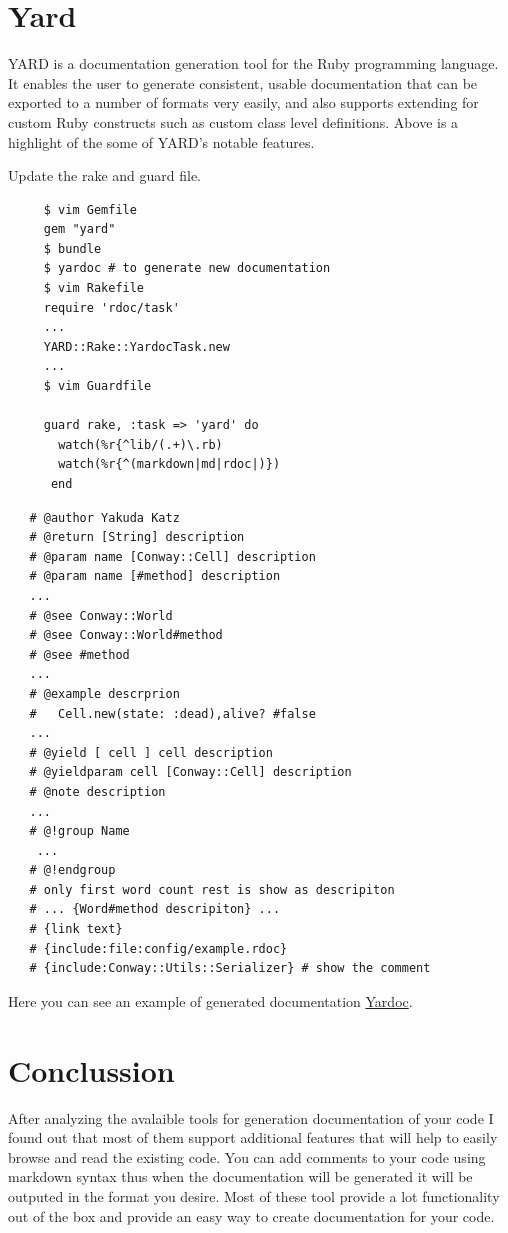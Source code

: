 \documentclass{article}
\begin{document}
  \section{Yard}

  YARD is a documentation generation tool for the Ruby programming language. It enables 
  the user to generate consistent, usable documentation that can be exported to a number 
  of formats very easily, and also supports extending for custom Ruby constructs such 
  as custom class level definitions. Above is a highlight of the some of YARD's notable features.

   Update the rake and guard file.

  \begin{lstlisting}
     $ vim Gemfile
     gem "yard"
     $ bundle
     $ yardoc # to generate new documentation
     $ vim Rakefile
     require 'rdoc/task'
     ...
     YARD::Rake::YardocTask.new
     ...
     $ vim Guardfile

     guard rake, :task => 'yard' do                                                
       watch(%r{^lib/(.+)\.rb)                                                       
       watch(%r{^(markdown|md|rdoc|)})                                               
      end                                                                             

    \end{lstlisting}

   \begin{lstlisting}
   # @author Yakuda Katz 
   # @return [String] description
   # @param name [Conway::Cell] description 
   # @param name [#method] description 
   ...
   # @see Conway::World 
   # @see Conway::World#method
   # @see #method 
   ...
   # @example descrprion
   #   Cell.new(state: :dead),alive? #false
   ...
   # @yield [ cell ] cell description
   # @yieldparam cell [Conway::Cell] description
   # @note description
   ...
   # @!group Name
    ...
   # @!endgroup 
   # only first word count rest is show as descripiton 
   # ... {Word#method descripiton} ... 
   # {link text}
   # {include:file:config/example.rdoc}
   # {include:Conway::Utils::Serializer} # show the comment
   \end{lstlisting}

   Here you can see an example of generated documentation 
   \href{http://www.rubydoc.info/gems/yard/index}{Yardoc}.

 \section{Conclussion}

    After analyzing the avalaible tools for generation documentation of your code
    I found out that most of them support additional features that will help to easily 
    browse and read the existing code. You can add comments to your code using markdown
    syntax thus when the documentation will be generated it will be outputed in the format you
    desire. Most of these tool provide a lot functionality out of the box and provide an easy way
    to create documentation for your code.
\end{document}
